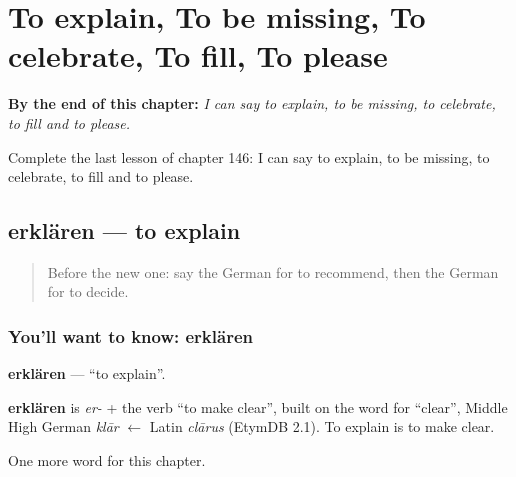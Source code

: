 
\chapter{To explain, To be missing, To celebrate, To fill, To please}
\label{ch:ge-to-explain-to-be-missing-to-celebrate-to-fill-to-please}

\begin{chapteropening}
\textbf{By the end of this chapter:} \emph{I can say to explain, to be missing, to celebrate, to fill and to please.}

Complete the last lesson of chapter 146: I can say to explain, to be missing, to celebrate, to fill and to please.
\end{chapteropening}

\section[erklären]{erklären — to explain}

\label{lesson:GE-C146-erklaeren}



\begin{quote}
Before the new one: say the German for to recommend, then the German for to decide.
\end{quote}

\subsection*{You'll want to know: erklären}
\textbf{erklären} — \textquotedblleft{}to explain\textquotedblright{}.

\begin{cousinweb}
\textbf{erklären} is \emph{er-} + the verb \textquotedblleft{}to make clear\textquotedblright{}, built on the word for \textquotedblleft{}clear\textquotedblright{}, Middle High German \emph{klār} $\leftarrow$ Latin \emph{clārus} (EtymDB 2.1). To explain is to make clear.
\end{cousinweb}

\begin{grammarlens}[title={What you've built}]
One more word for this chapter.
\end{grammarlens}

